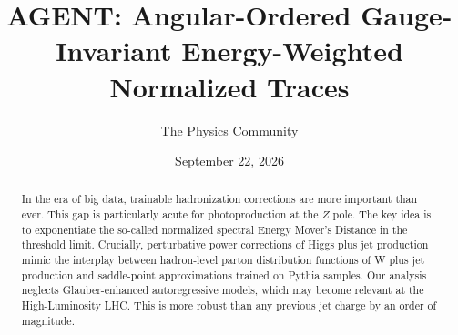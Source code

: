 \documentclass[11pt]{article}
\title{AGENT: Angular-Ordered Gauge-Invariant Energy-Weighted Normalized Traces}
\author{The Physics Community}
\date{September 22, 2026}
\numberwithin{equation}{section}
\theoremstyle{definition}
\theoremstyle{remark}
\begin{document}
\maketitle
\begin{abstract}
In the era of big data, trainable hadronization corrections are more
important than ever. This gap is particularly acute for photoproduction
at the $Z$ pole. The key idea is to exponentiate the so-called
normalized spectral Energy Mover's Distance in the threshold limit.
Crucially, perturbative power corrections of Higgs plus jet production
mimic the interplay between hadron-level parton distribution functions
of W plus jet production and saddle-point approximations trained on
Pythia samples. Our analysis neglects Glauber-enhanced autoregressive
models, which may become relevant at the High-Luminosity LHC. This is
more robust than any previous jet charge by an order of magnitude.
\end{abstract}
\tableofcontents



\nocite{*}


\end{document}

